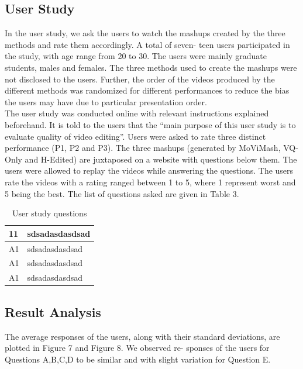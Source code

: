 \documentclass{sig-alternate}
\begin{document}
\subsection{User Study}

In the user study, we ask the users to watch the mashups created
by the three methods and rate them accordingly. A total of seven-
teen users participated in the study, with age range from 20 to 30.
The users were mainly graduate students, males and females. The
three methods used to create the mashups were not disclosed to the
users. Further, the order of the videos produced by the different
methods was randomized for different performances to reduce the
bias the users may have due to particular presentation order.\\
The user study was conducted online with relevant instructions
explained beforehand. It is told to the users that the \enquote{main purpose of this user study is to evaluate quality of video editing}. Users
were asked to rate three distinct performance (P1, P2 and P3). The
three mashups (generated by MoViMash, VQ-Only and H-Edited)
are juxtaposed on a website with questions below them. The users were allowed to replay the videos while answering the questions.
The users rate the videos with a rating ranged between 1 to 5, where
1 represent worst and 5 being the best. The list of questions asked
are given in Table 3.

\begin{table}
\centering
\caption{User study questions }
\begin{tabular}{p{1.2cm}|p{3.8cm}} \hline
11& sdsadasdasdsad\\ \hline
A1 & sdsadasdasdsad\\ \hline
A1 &sdsadasdasdsad\\ \hline
A1 &sdsadasdasdsad\\ \hline
\end{tabular}
\end{table}

\subsection{Result Analysis}

The average responses of the users, along with their standard
deviations, are plotted in Figure 7 and Figure 8. We observed re-
sponses of the users for Questions A,B,C,D to be similar and with
slight variation for Question E.
\end{document}
